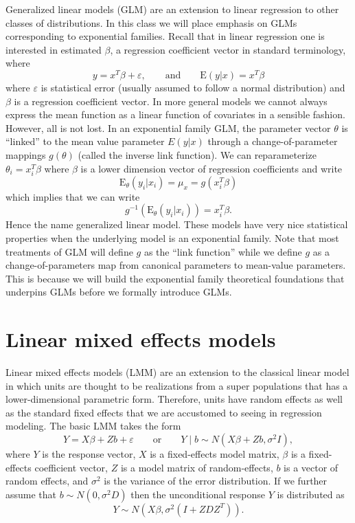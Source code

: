 \documentclass[12pt]{article}
\newcommand{\E}{\mathrm{E}}
\DeclareMathOperator{\E}{E}
\begin{document}
Generalized linear models (GLM) are an extension to linear regression to other classes of distributions. In this class we will place emphasis on GLMs corresponding to exponential families. Recall that in linear regression one is interested in estimated $\beta$, a regression coefficient vector in standard terminology, where 
$$
  y = x^T\beta + \varepsilon, 
    \qquad \text{and} \qquad 
  \E(y|x) = x^T\beta
$$
where $\varepsilon$ is statistical error (usually assumed to follow a normal distribution) and $\beta$ is a regression coefficient vector. In more general models we cannot always express the mean function as a linear function of covariates in a sensible fashion. However, all is not lost. In an exponential family GLM, the parameter vector $\theta$ is ``linked'' to the mean value parameter $E(y|x)$ through a change-of-parameter mappings $g(\theta)$ (called the inverse link function). We can reparameterize $\theta_i = x_i^T\beta$ where $\beta$ is a lower dimension vector of regression coefficients and write
$$
 \E_\theta(y_i|x_i) = \mu_x = g(x_i^T\beta) 
$$
which implies that we can write
$$
  g^{-1}\left(\E_\theta(y_i|x_i)\right) = x_i^T\beta.
$$
Hence the name generalized linear model. These models have very nice statistical properties when the underlying model is an exponential family. Note that most treatments of GLM will define $g$ as the ``link function'' while we define $g$ as a change-of-parameters map from canonical parameters to mean-value parameters. This is because we will build the exponential family theoretical foundations that underpins GLMs before we formally introduce GLMs.


\section*{Linear mixed effects models}

Linear mixed effects models (LMM) are an extension to the classical linear model in which units are thought to be realizations from a super populations that has a lower-dimensional parametric form. Therefore, units have random effects as well as the standard fixed effects that we are accustomed to seeing in regression modeling. The basic LMM takes the form
$$
  Y = X\beta + Zb + \varepsilon \qquad \text{or} \qquad Y\mid b \sim N(X\beta + Zb, \sigma^2I),
$$
where $Y$ is the response vector, $X$ is a fixed-effects model matrix, $\beta$ is a fixed-effects coefficient vector, $Z$ is a model matrix of random-effects, $b$ is a vector of random effects, and $\sigma^2$ is the variance of the error distribution. If we further assume that $b \sim N(0, \sigma^2D)$ then the unconditional response $Y$ is distributed as 
$$
  Y \sim N(X\beta, \sigma^2(I + ZDZ^T)).
$$
\end{document}
